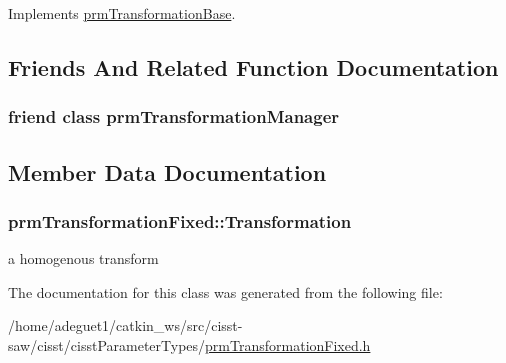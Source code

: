 Implements \hyperlink{classprm_transformation_base_a64df0853559412fe0c48fc610ad2f6bf}{prm\-Transformation\-Base}.



\subsection{Friends And Related Function Documentation}
\hypertarget{classprm_transformation_fixed_af7fc0618e84bdf8b1d22bc2635f29eea}{
\subsubsection[{prm\-Transformation\-Manager}]{\setlength{\rightskip}{0pt plus 5cm}friend class {\bf prm\-Transformation\-Manager}\hspace{0.3cm}{\ttfamily [friend]}}}\label{classprm_transformation_fixed_af7fc0618e84bdf8b1d22bc2635f29eea}


\subsection{Member Data Documentation}
\hypertarget{classprm_transformation_fixed_a3b213d736a137afc62afc53ca79597b1}{
\subsubsection[{Transformation}]{ prm\-Transformation\-Fixed\-::\-Transformation\hspace{0.3cm}{\ttfamily [protected]}}}\label{classprm_transformation_fixed_a3b213d736a137afc62afc53ca79597b1}
a homogenous transform 

The documentation for this class was generated from the following file\-:\begin{DoxyCompactItemize}
\item 
/home/adeguet1/catkin\-\_\-ws/src/cisst-\/saw/cisst/cisst\-Parameter\-Types/\hyperlink{prm_transformation_fixed_8h}{prm\-Transformation\-Fixed.\-h}\end{DoxyCompactItemize}

